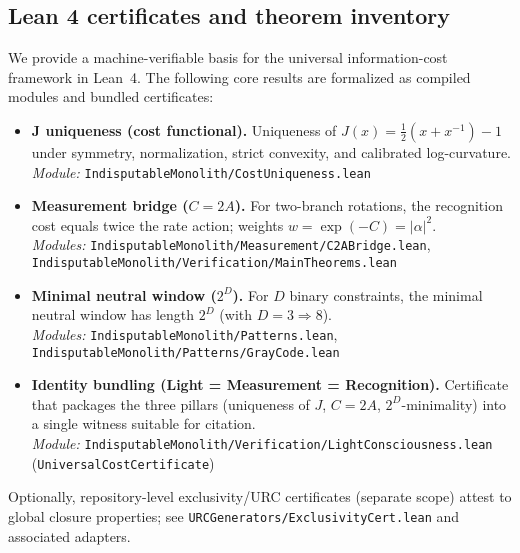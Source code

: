 \documentclass[12pt,a4paper]{article}
\begin{document}
\subsection{Lean 4 certificates and theorem inventory}
We provide a machine-verifiable basis for the universal information-cost framework in Lean~4. The following core results are formalized as compiled modules and bundled certificates:
\begin{itemize}
  \item \textbf{J uniqueness (cost functional).} Uniqueness of $J(x)=\tfrac{1}{2}(x+x^{-1})-1$ under symmetry, normalization, strict convexity, and calibrated log-curvature.\\
  \emph{Module:} \texttt{IndisputableMonolith/CostUniqueness.lean}
  \item \textbf{Measurement bridge ($C=2A$).} For two-branch rotations, the recognition cost equals twice the rate action; weights $w=\exp(-C)=|\alpha|^{2}$.\\
  \emph{Modules:} \texttt{IndisputableMonolith/Measurement/C2ABridge.lean}, \texttt{IndisputableMonolith/Verification/MainTheorems.lean}
  \item \textbf{Minimal neutral window ($2^{D}$).} For $D$ binary constraints, the minimal neutral window has length $2^{D}$ (with $D=3\Rightarrow 8$).\\
  \emph{Modules:} \texttt{IndisputableMonolith/Patterns.lean}, \texttt{IndisputableMonolith/Patterns/GrayCode.lean}
  \item \textbf{Identity bundling (Light = Measurement = Recognition).} Certificate that packages the three pillars (uniqueness of $J$, $C=2A$, $2^{D}$-minimality) into a single witness suitable for citation.\\
  \emph{Module:} \texttt{IndisputableMonolith/Verification/LightConsciousness.lean} (\texttt{UniversalCostCertificate})
\end{itemize}
Optionally, repository-level exclusivity/URC certificates (separate scope) attest to global closure properties; see \texttt{URCGenerators/ExclusivityCert.lean} and associated adapters.
\end{document}
